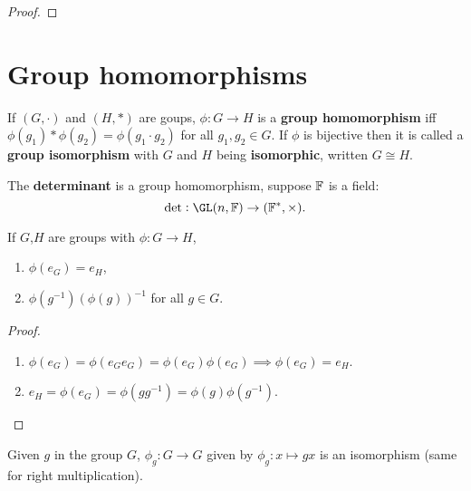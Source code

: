 \documentclass[../Year1.tex]{subfiles}
\begin{document}
\begin{proof}
    
\end{proof}

\section{Group homomorphisms}

\begin{definition}
    If $(G,\cdot)$ and $(H,\ast)$ are goups, $\phi:G\rightarrow H$ is a \textbf{group homomorphism} iff $\phi(g_1)\ast\phi(g_2) = \phi(g_1\cdot g_2)$ for all $g_1,g_2\in G$. If $\phi$ is bijective then it is called a \textbf{group isomorphism} with $G$ and $H$ being \textbf{isomorphic}, written $G\cong H$.
\end{definition}

\begin{example}[determinant]
    The \textbf{determinant} is a group homomorphism, suppose $\mathbb{F}$ is a field:\[
    \det: \GL(n,\FF)\rightarrow(\FF^*,\times)
    \textcolor{black}{.}
    \]
\end{example}

\vspace{-30pt}

\begin{lemma}
    If $G$,$H$ are groups with $\phi:G\rightarrow H$, \begin{enumerate}
        \item $\phi(e_G) = e_H$,
        \item $\phi(g^{-1}) {(\phi(g))}^{-1}$ for all $g\in G$.
    \end{enumerate}
\end{lemma}

\begin{proof}
    \begin{enumerate}
        \item $\phi(e_G)=\phi(e_G e_G)=\phi(e_G)\phi(e_G)\implies \phi(e_G)=e_H$. 
        \item $e_H=\phi(e_G)=\phi(gg^{-1})=\phi(g)\phi(g^{-1})$.\vspace{-15pt}
    \end{enumerate}
\end{proof}

\begin{lemma}\label{bijection from element}
    Given $g$ in the group $G$, $\phi_g:G\rightarrow G$ given by $\phi_g:x\mapsto gx$ is an isomorphism (same for right multiplication).
\end{lemma}
\end{document}
